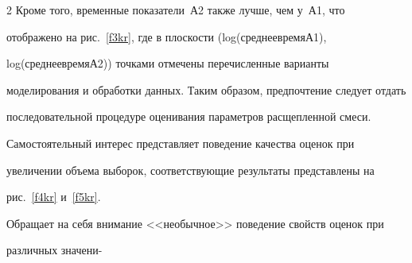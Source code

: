 \begin{multicols}{2}
     Кроме того, временные показатели~А2 также лучше, чем у~А1, что 


отображено на рис.~\ref{f3kr}, где в плоскости (log(сред\-нее\;вре\-мя\;А1), 


log(сред\-нее\;вре\-мя\;А2)) точками отмечены перечисленные варианты 


моделирования и обработки данных. Таким образом, предпочтение следует отдать 


последовательной процедуре оценивания параметров расщепленной смеси.





     







    


     Самостоятельный интерес представляет поведение качества оценок при 


увеличении объема выборок, соответствующие результаты представлены на 


рис.~\ref{f4kr} и~\ref{f5kr}. 





    


     Обращает на себя внимание <<необычное>> поведение свойств оценок при 


различных значени-\linebreak 


\vspace*{-12pt}


\pagebreak


\end{multicols}






